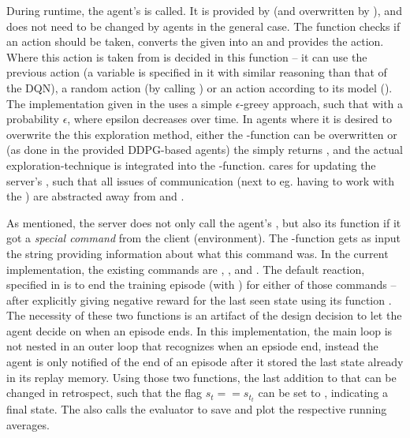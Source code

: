 During runtime, the agent's  is called. It is provided by  (and overwritten by ), and does not need to be changed by agents in the general case. The function checks if an action should be taken, converts the given  into an  and provides the action. Where this action is taken from is decided in this function -- it can use the previous action (a variable  is specified in it with similar reasoning than that of the DQN\cite{mnih_human-level_2015}), a random action (by calling ) or an action according to its model (). The implementation given in the  uses a simple $\epsilon$-greey approach, such that  with a probability $\epsilon$, where epsilon decreases over time. In agents where it is desired to overwrite the this exploration method, either the -function can be overwritten or (as done in the provided DDPG-based agents) the  simply returns , and the actual exploration-technique is integrated into the -function. 
 cares for updating the server's , such that all issues of communication (next to eg. having to work with the ) are abstracted away from  and . 

As mentioned, the server does not only call the agent's , but also its function  if it got a \textit{special command} from the client (environment). The -function gets as input the string providing information about what this command was. In the current implementation, the existing commands are , ,  and  . The default reaction, specified in  is to end the training episode (with ) for either of those commands -- after explicitly giving negative reward for the last seen state using its function . The necessity of these two functions is an artifact of the design decision to let the agent decide on when an episode ends. In this implementation, the main loop is not nested in an outer loop that recognizes when an epsiode end, instead the agent is only notified of the end of an episode after it stored the last state already in its replay memory. Using those two functions, the last addition to that can be changed in retrospect, such that the flag $s_t == s_{t_t}$ can be set to , indicating a final state. The  also calls the evaluator to save and plot the respective running averages.

